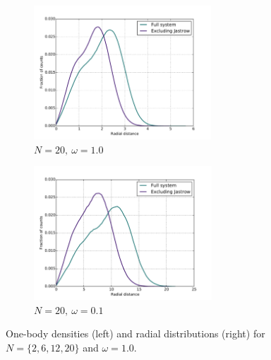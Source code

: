 \documentclass[english, a4paper]{article}
\begin{document}
\begin{figure}[H]
	\begin{subfigure}{0.5\textwidth}
		\includegraphics[width=\textwidth, height= 5cm]{figures/radialDistribution/radialDistributionN20w100Se8.pdf}
		\caption{$N=20,\:\omega=1.0$}
	\end{subfigure}
	\begin{subfigure}{0.5\textwidth}
		\includegraphics[width=\textwidth, height= 5cm]{figures/radialDistribution/radialDistributionN20w10Se7.pdf}
		\caption{$N=20,\:\omega=0.1$}
	\end{subfigure}
	
	\vspace{3mm}
	
	\caption{One-body densities (left) and radial distributions (right) for $N=\{2,6,12,20\}$ and $\omega = 1.0$.}
	\label{fig:Onebody&RadialDist}
\end{figure}











\newpage


\end{document}
